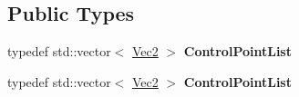 \subsection*{Public Types}
\begin{DoxyCompactItemize}
\item 
\mbox{\label{classPUDynamicAttributeCurved_a685bdb7d89deedfccb4510eeba60bd4e}} 
typedef std\+::vector$<$ \hyperlink{classVec2}{Vec2} $>$ {\bfseries Control\+Point\+List}
\item 
\mbox{\label{classPUDynamicAttributeCurved_a685bdb7d89deedfccb4510eeba60bd4e}} 
typedef std\+::vector$<$ \hyperlink{classVec2}{Vec2} $>$ {\bfseries Control\+Point\+List}
\end{DoxyCompactItemize}
